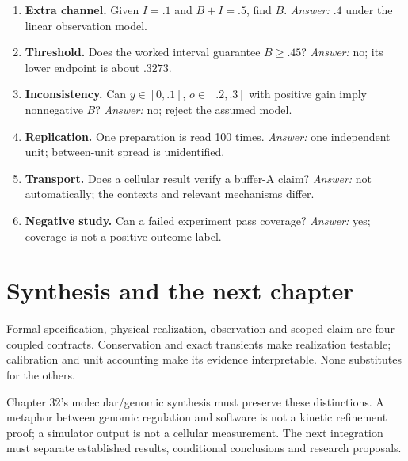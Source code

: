 \begin{enumerate}
\item \textbf{Extra channel.} Given $I=.1$ and $B+I=.5$, find $B$.
\emph{Answer:} $.4$ under the linear observation model.
\item \textbf{Threshold.} Does the worked interval guarantee $B\ge.45$?
\emph{Answer:} no; its lower endpoint is about $.3273$.
\item \textbf{Inconsistency.} Can $y\in[0,.1]$, $o\in[.2,.3]$ with positive
gain imply nonnegative $B$? \emph{Answer:} no; reject the assumed model.
\item \textbf{Replication.} One preparation is read 100 times.
\emph{Answer:} one independent unit; between-unit spread is unidentified.
\item \textbf{Transport.} Does a cellular result verify a buffer-A claim?
\emph{Answer:} not automatically; the contexts and relevant mechanisms differ.
\item \textbf{Negative study.} Can a failed experiment pass coverage?
\emph{Answer:} yes; coverage is not a positive-outcome label.
\end{enumerate}

\section{Synthesis and the next chapter}
Formal specification, physical realization, observation and scoped claim are
four coupled contracts. Conservation and exact transients make realization
testable; calibration and unit accounting make its evidence interpretable.
None substitutes for the others.

Chapter 32's molecular/genomic synthesis must preserve these distinctions.
A metaphor between genomic regulation and software is not a kinetic refinement
proof; a simulator output is not a cellular measurement. The next integration
must separate established results, conditional conclusions and research proposals.
